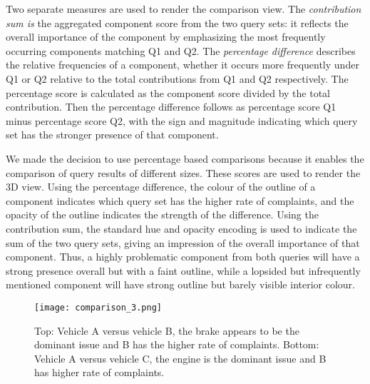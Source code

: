 Two separate measures are used to render the comparison view.
The \emph{contribution sum is} the aggregated component score from the two
query sets: it reflects the overall importance of the component by emphasizing
the most frequently occurring components matching Q1 and
Q2. The \emph{percentage difference} describes the relative frequencies of a
component, whether it occurs more frequently under Q1 or Q2 relative
to the total contributions from Q1 and Q2 respectively. The percentage
score is calculated as the component score divided by the total
contribution. Then the percentage difference follows as percentage
score Q1 minus percentage score Q2, with the sign and magnitude indicating
which query set has the stronger presence of that component.

We made the decision to use percentage based comparisons because it
enables the comparison of query results of different sizes.
These scores are used to render the 3D view. Using the percentage
difference, the colour of the outline of a component indicates which
query set has the higher rate of complaints, and the opacity of the outline
indicates the strength of the difference. Using the contribution
sum, the standard hue and opacity encoding is used to indicate the
sum of the two query sets, giving an impression of the overall importance
of that component. Thus, a highly problematic component from
both queries will have a strong presence overall but with a faint outline,
while a lopsided but infrequently mentioned component will have
strong outline but barely visible interior colour.


	\begin{figure}
	 \centering  
	 \texttt{[image: comparison\_3.png]}
	 \caption[Comparison View]{Top: Vehicle A versus vehicle B, the brake appears
	 to be the dominant issue and B has the higher rate of complaints. Bottom:
	 Vehicle A versus vehicle C, the engine is the dominant issue and B has higher rate of complaints.}
	 \label{figure:comparison}
	\end{figure}
 

